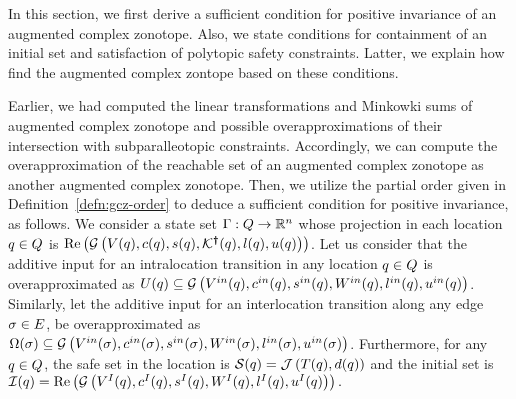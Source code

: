 In this section, we first derive a sufficient condition for positive
invariance of an augmented complex zonotope.  Also, we state
conditions for containment of an initial set and satisfaction of
polytopic safety constraints.  Latter, we explain how find the
augmented complex zontope based on these conditions.

Earlier, we had computed the linear transformations and Minkowki sums
of augmented complex zonotope and possible overapproximations of their
intersection with subparalleotopic constraints.  Accordingly, we can
compute the overapproximation of the reachable set of an augmented
complex zonotope as another augmented complex zonotope.  Then, we
utilize the partial order given in Definition~\ref{defn:gcz-order} to
  deduce a sufficient condition for positive invariance, as follows.
%
We consider a state set $\Gamma:Q\rightarrow\mathbb{R}^n$ whose
  projection in each location $q\in Q$ is
  $\operatorname{\operatorname{Re}}\left(\mathcal{G}\left(V(q),c(q),s(q),\mathcal{K}^{\bm{\dagger}}(q),l(q),u(q)\right)\right)$.
  Let us consider that the additive input for an intralocation
  transition in any location $q\in Q$ is overapproximated
  as
  $U(q)\subseteq \mathcal{G}\left(V^{in}(q),c^{in}(q),s^{in}(q),W^{in}(q),l^{in}(q),u^{in}(q)\right)$.
  Similarly, let the additive input for an interlocation transition
  along any edge $\sigma\in E$, be overapproximated as
  $\Omega(\sigma)\subseteq \mathcal{G}\left(V^{in}(\sigma),c^{in}(\sigma),s^{in}(\sigma),W^{in}(\sigma),l^{in}(\sigma),u^{in}(\sigma)\right)$.
  Furthermore, for any $q\in Q$, the safe set in the
  location is $\mathcal{S}(q)=\mathcal{J}\left(T(q),d(q)\right)$ and the
  initial set is
  $\mathcal{I}(q)=\operatorname{\operatorname{Re}}\left(\mathcal{G}\left(V^I(q),c^I(q),s^I(q),W^I(q),l^I(q),u^I(q)\right)\right).$
  


